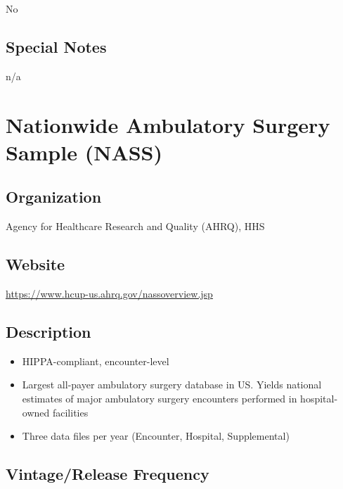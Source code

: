 \documentclass[
]{book}
\providecommand{\tightlist}{%
  \setlength{\itemsep}{0pt}\setlength{\parskip}{0pt}}
\begin{document}
No

\hypertarget{special-notes-67}{%
\section{Special Notes}\label{special-notes-67}}

n/a

\mainmatter

\hypertarget{nationwide-ambulatory-surgery-sample-nass}{%
\chapter{Nationwide Ambulatory Surgery Sample (NASS)}\label{nationwide-ambulatory-surgery-sample-nass}}

\hypertarget{organization-68}{%
\section{Organization}\label{organization-68}}

Agency for Healthcare Research and Quality (AHRQ), HHS

\hypertarget{website-68}{%
\section{Website}\label{website-68}}

\url{https://www.hcup-us.ahrq.gov/nassoverview.jsp}

\hypertarget{description-68}{%
\section{Description}\label{description-68}}

\begin{itemize}
\tightlist
\item
  HIPPA-compliant, encounter-level
\item
  Largest all-payer ambulatory surgery database in US. Yields national estimates of major ambulatory surgery encounters performed in hospital-owned facilities
\item
  Three data files per year (Encounter, Hospital, Supplemental)
\end{itemize}

\hypertarget{vintagerelease-frequency-68}{%
\section{Vintage/Release Frequency}\label{vintagerelease-frequency-68}}
\end{document}
